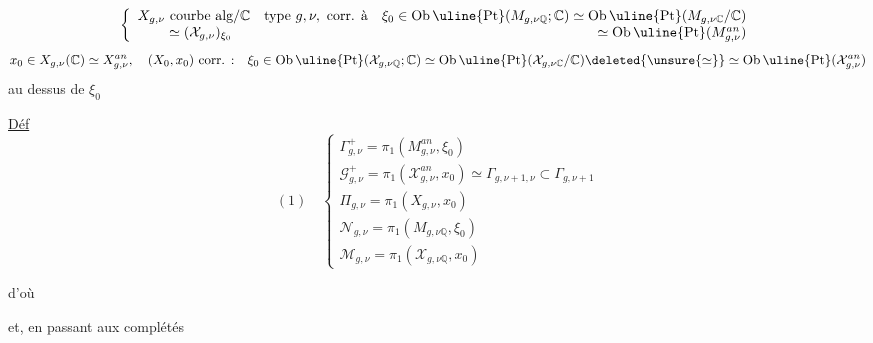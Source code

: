 \[
\left\{\begin{array}{l}
X_{g,\nu}\ \text{courbe alg/}\mathbb C\quad\text{type }g,\nu,\ \text{corr. à}\quad
\xi_0\in\operatorname{Ob}\uline{\mathrm{Pt}}(M_{g,\nu\mathbb Q};\mathbb C)\simeq\operatorname{Ob}\uline{\mathrm{Pt}}(M_{g,\nu\mathbb C}/\mathbb C)\\
\phantom{X_{g,\nu}}\simeq(\mathcal X_{g,\nu})_{\xi_0}\hfill\simeq\operatorname{Ob}\uline{\mathrm{Pt}}(M_{g,\nu}^{an})
\end{array}\right.
\]
\[
x_0\in X_{g,\nu}(\mathbb C)\simeq X_{g,\nu}^{an},\quad (X_0,x_0)\ \text{corr. :}\quad
\xi_0\in\operatorname{Ob}\uline{\mathrm{Pt}}(\mathcal X_{g,\nu\mathbb Q};\mathbb C)\simeq\operatorname{Ob}\uline{\mathrm{Pt}}(\mathcal X_{g,\nu\mathbb C}/\mathbb C)
\deleted{\unsure{\simeq}}\simeq\operatorname{Ob}\uline{\mathrm{Pt}}(\mathcal X_{g,\nu}^{an})
\]
au dessus de $\xi_0$

\uline{Déf}
\[
(1)\quad\left\{\begin{array}{l}
\Gamma_{g,\nu}^{+}=\pi_1(M_{g,\nu}^{an},\xi_0)\\
\mathcal G_{g,\nu}^{+}=\pi_1(\mathcal X_{g,\nu}^{an},x_0)\simeq\Gamma_{g,\nu+1,\nu}\subset\Gamma_{g,\nu+1}\\
\Pi_{g,\nu}=\pi_1(X_{g,\nu},x_0)\\[4pt]
\mathcal N_{g,\nu}=\pi_1(M_{g,\nu\mathbb Q},\xi_0)\\
\mathcal M_{g,\nu}=\pi_1(\mathcal X_{g,\nu\mathbb Q},x_0)
\end{array}\right.
\]

d'où

 et, en passant aux complétés 

